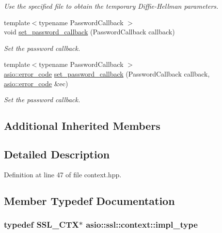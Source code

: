 \begin{DoxyCompactItemize}
\begin{DoxyCompactList}\small\item\em Use the specified file to obtain the temporary Diffie-\/\+Hellman parameters. \end{DoxyCompactList}\item 
{\footnotesize template$<$typename Password\+Callback $>$ }\\void \hyperlink{classasio_1_1ssl_1_1context_ac2fe5dbe49847c439573f9e7c9a9e8c1}{set\+\_\+password\+\_\+callback} (Password\+Callback callback)
\begin{DoxyCompactList}\small\item\em Set the password callback. \end{DoxyCompactList}\item 
{\footnotesize template$<$typename Password\+Callback $>$ }\\\hyperlink{classasio_1_1error__code}{asio\+::error\+\_\+code} \hyperlink{classasio_1_1ssl_1_1context_a382424de2e3ac27fee2427b7d11975e4}{set\+\_\+password\+\_\+callback} (Password\+Callback callback, \hyperlink{classasio_1_1error__code}{asio\+::error\+\_\+code} \&ec)
\begin{DoxyCompactList}\small\item\em Set the password callback. \end{DoxyCompactList}\end{DoxyCompactItemize}
\subsection*{Additional Inherited Members}


\subsection{Detailed Description}


Definition at line 47 of file context.\+hpp.



\subsection{Member Typedef Documentation}
\hypertarget{classasio_1_1ssl_1_1context_a5d497f2bb2fc277da12dc07c6ceea6fd}{}
\subsubsection[{impl\+\_\+type}]{\setlength{\rightskip}{0pt plus 5cm}typedef S\+S\+L\+\_\+\+C\+T\+X$\ast$ {\bf asio\+::ssl\+::context\+::impl\+\_\+type}}\label{classasio_1_1ssl_1_1context_a5d497f2bb2fc277da12dc07c6ceea6fd}


